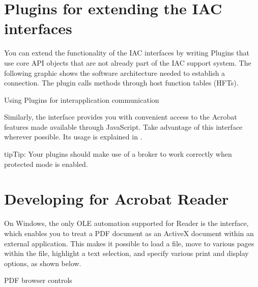 \documentclass[letterpaper,12pt,english,openany,oneside]{sphinxmanual}
\begin{document}
\section{Plugins for extending the IAC interfaces}
\label{\detokenize{index:plugins-for-extending-the-iac-interfaces}}
You can extend the functionality of the IAC interfaces by writing Plugins that use core API objects that are not already part of the IAC support system. The following graphic shows the software architecture needed to establish a connection. The plug\sphinxhyphen{}in calls methods through host function tables (HFTs).

Using Plugins for interapplication communication

\noindent{}

Similarly, the  interface provides you with convenient access to the Acrobat features made available through JavaScript. Take advantage of this interface wherever possible. Its usage is explained in .

\begin{sphinxadmonition}{tip}{Tip:}
Your plugins should make use of a broker to work correctly when protected mode is enabled.
\end{sphinxadmonition}


\section{Developing for Acrobat Reader}
\label{\detokenize{index:developing-for-acrobat-reader}}
On Windows, the only OLE automation supported for Reader is the  interface, which enables you to treat a PDF document as an ActiveX document within an external application. This makes it possible to load a file, move to various pages within the file, highlight a text selection, and specify various print and display options, as shown below.

PDF browser controls

\noindent{}
\end{document}
